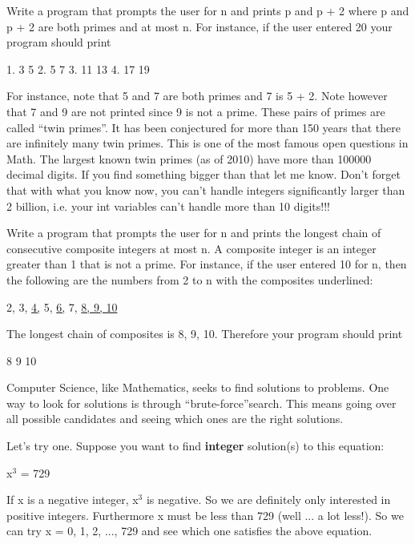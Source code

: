 \begin{console}
\begin{console}
\begin{ex}
Write a program that prompts the user for n and
prints p and p + 2 where p and p + 2 are both primes and at most n. For
instance, if the user entered 20 your program should print
\begin{console}
1. 3 5
2. 5 7
3. 11 13
4. 17 19
\end{console}
For instance, note that 5 and 7 are both primes and 7 is 5 + 2. Note
however that 7 and 9 are not printed since 9 is not a prime. These pairs
of primes are called ``twin primes''. It has been conjectured for more
than 150 years that there are infinitely many twin primes. This is one
of the most famous open questions in Math. The largest known twin primes
(as of 2010) have more than 100000 decimal digits. If you find something
bigger than that let me know. Don't forget that with
what you know now, you can't handle integers
significantly larger than 2 billion, i.e. your int variables
can't handle more than 10 digits!!!
\end{ex}
\begin{ex}
Write a program that prompts the user for n and
prints the longest chain of consecutive composite integers at most n. A
composite integer is an integer greater than 1 that is not a prime. For
instance, if the user entered 10 for n, then the following are the
numbers from 2 to n with the composites underlined:
\begin{center}
2, 3, \underline{4,} 5, \underline{6,} 7, \underline{8, 9, 10}
\end{center}
The longest chain of composites is 8, 9, 10. Therefore your program
should print
\begin{console}
8 9 10
\end{console}
\end{ex}

\newpage{}

Computer Science, like Mathematics, seeks to find solutions to problems.
One way to look for solutions is through ``brute-force''search. This
means going over all possible candidates and seeing which ones are the
right solutions.

Let's try one. Suppose you want to find \textbf{integer} solution(s) to this equation:
\begin{center}
x$^{3}$ = 729
\end{center}
If x is a negative integer, x$^{3}$ is negative. So we are definitely only interested in positive integers. Furthermore x must be less than 729 (well ... a lot less!). So we can try x = 0, 1, 2, ..., 729 and see which one satisfies the above equation.


\end{console}
\end{console}
